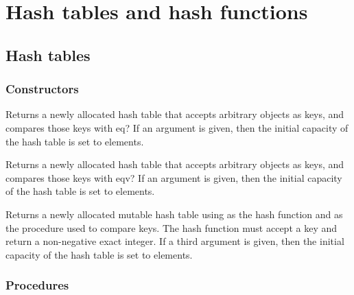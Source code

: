 \documentclass[twoside,twocolumn]{algol60}
\begin{document}
\chapter{Hash tables and hash functions}


\section{Hash tables}

\subsection{Constructors}


\begin{entry}{%
}

Returns a newly allocated hash table that accepts arbitrary objects 
as keys, and compares those keys with eq?  If an argument is given, 
then the initial capacity of the hash table is set to  elements.

\end{entry}

\begin{entry}{%
}

Returns a newly allocated hash table that accepts arbitrary objects 
as keys, and compares those keys with eqv?  If an argument is given, 
then the initial capacity of the hash table is set to  elements.

\end{entry}

\begin{entry}{%
}

Returns a newly allocated mutable hash table using  
as the hash function and  as the procedure used to 
compare keys.  The hash function must accept a key and return a 
non-negative exact integer.  If a third argument is given, then the 
initial capacity of the hash table is set to  elements.

\end{entry}

\subsection{Procedures}
\end{document}
